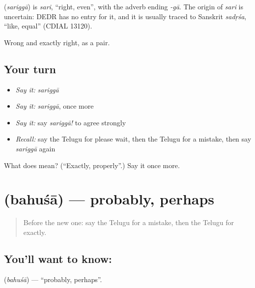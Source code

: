 \begin{cousinweb}
\textbf{} (\emph{sariggā}) is \emph{sari}, \textquotedblleft{}right, even\textquotedblright{}, with the adverb ending \emph{-gā}. The origin of \emph{sari} is uncertain: DEDR has no entry for it, and it is usually traced to Sanskrit \emph{sadṛśa}, \textquotedblleft{}like, equal\textquotedblright{} (CDIAL 13120).
\end{cousinweb}

\begin{grammarlens}[title={What you've built}]
Wrong and exactly right, as a pair.
\end{grammarlens}

\subsection*{Your turn}
\begin{itemize}
\raggedright
  \item \emph{Say it:} \emph{sariggā}
  \item \emph{Say it:} \emph{sariggā}, once more
  \item \emph{Say it:} say \emph{sariggā!} to agree strongly
  \item \emph{Recall:} say the Telugu for please wait, then the Telugu for a mistake, then say \emph{sariggā} again
\end{itemize}

\begin{tcolorbox}[breakable,colback=teal!4,colframe=teal!35!black,title={Before you move on}]
What does  mean? (\textquotedblleft{}Exactly, properly\textquotedblright{}.) Say it once more.
\end{tcolorbox}
\section[\texorpdfstring{\te{బహుశా} (bahuśā)}{బహుశా (bahuśā)}]{ (bahuśā) — probably, perhaps}

\label{lesson:TE-C87-probably}



\begin{quote}
Before the new one: say the Telugu for a mistake, then the Telugu for exactly.
\end{quote}

\subsection*{You'll want to know: }
\textbf{} (\emph{bahuśā}) — \textquotedblleft{}probably, perhaps\textquotedblright{}.

